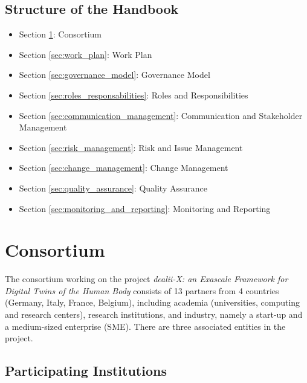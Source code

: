 \documentclass[a4paper,12pt]{article}
\begin{document}
\subsection{\textcolor{EUblue}{Structure of the Handbook}}
\begin{itemize}
    \item Section \ref{sec:consortium}: Consortium
    \item Section \ref{sec:work_plan}: Work Plan
    \item Section \ref{sec:governance_model}: Governance Model
    \item Section \ref{sec:roles_responsabilities}: Roles and Responsibilities
    \item Section \ref{sec:communication_management}: Communication and Stakeholder Management
    \item Section \ref{sec:risk_management}: Risk and Issue Management
    \item Section \ref{sec:change_management}: Change Management
    \item Section \ref{sec:quality_assurance}: Quality Assurance
    \item Section \ref{sec:monitoring_and_reporting}: Monitoring and Reporting
\end{itemize}

\newpage

\section{\textcolor{EUblue}{Consortium}}
\label{sec:consortium}

The consortium working on the project \emph{dealii-X: an Exascale Framework for Digital Twins of the Human Body} consists of 13 partners from 4 countries (Germany, Italy, France, Belgium), including academia (universities, computing and research centers), research institutions, and industry, namely a start-up and a medium-sized enterprise (SME). There are three associated entities in the project.

\subsection{\textcolor{EUblue}{Participating Institutions}}
\end{document}
